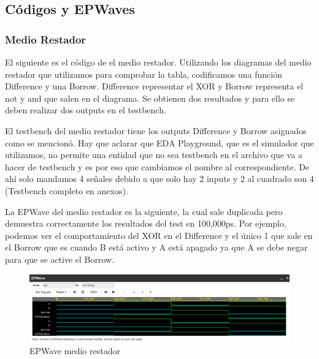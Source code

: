 \documentclass[12pt]{article}  %
\begin{document}
\subsection*{Códigos y EPWaves}

\subsubsection*{Medio Restador}

El siguiente es el código de el medio restador. Utilizando los diagramas del medio restador que utilizamos para comprobar la tabla, codificamos una función Difference y una Borrow. Difference representar el XOR y Borrow representa el not y and que salen en el diagrama. Se obtienen dos resultados y para ello se deben realizar dos outputs en el testbench.



El testbench del medio restador tiene los outputs Difference y Borrow asignados como se mencionó. Hay que aclarar que EDA Playground, que es el simulador que utilizamos, no permite una entidad que no sea testbench en el archivo que va a hacer de testbench y es por eso que cambiamos el nombre al correspondiente. De ahí solo mandamos 4 señales debido a que solo hay 2 inputs y 2 al cuadrado son 4 (Testbench completo en anexos).



La EPWave del medio restador es la siguiente, la cual sale duplicada pero demuestra correctamente los resultados del test en 100,000ps. Por ejemplo, podemos ver el comportamiento del XOR en el Difference y el único 1 que sale en el Borrow que es cuando B está activo y A está apagado ya que A se debe negar para que se active el Borrow.

\begin{figure}[!ht]
    \centering
    \caption{EPWave medio restador}
    \includegraphics[width=0.8\linewidth]{Imagenes/waves/halfwave.png}
\end{figure}
\end{document}
